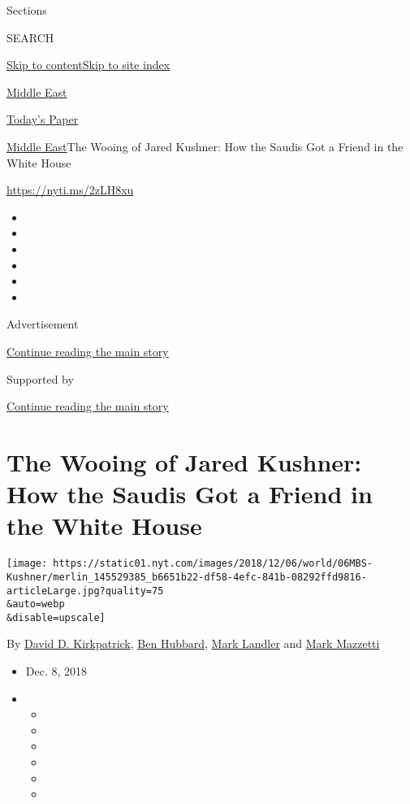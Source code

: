 Sections

SEARCH

\protect\hyperlink{site-content}{Skip to
content}\protect\hyperlink{site-index}{Skip to site index}

\href{https://www.nytimes.com/section/world/middleeast}{Middle East}

\href{https://myaccount.nytimes.com/auth/login?response_type=cookie\&client_id=vi}{}

\href{https://www.nytimes.com/section/todayspaper}{Today's Paper}

\href{/section/world/middleeast}{Middle East}\textbar{}The Wooing of
Jared Kushner: How the Saudis Got a Friend in the White House

\url{https://nyti.ms/2zLH8xu}

\begin{itemize}
\item
\item
\item
\item
\item
\item
\end{itemize}

Advertisement

\protect\hyperlink{after-top}{Continue reading the main story}

Supported by

\protect\hyperlink{after-sponsor}{Continue reading the main story}

\hypertarget{the-wooing-of-jared-kushner-how-the-saudis-got-a-friend-in-the-white-house}{%
\section{The Wooing of Jared Kushner: How the Saudis Got a Friend in the
White
House}\label{the-wooing-of-jared-kushner-how-the-saudis-got-a-friend-in-the-white-house}}

\texttt{[image: https://static01.nyt.com/images/2018/12/06/world/06MBS-Kushner/merlin\_145529385\_b6651b22-df58-4efc-841b-08292ffd9816-articleLarge.jpg?quality=75\\\&auto=webp\\\&disable=upscale]}

By \href{https://www.nytimes.com/by/david-d-kirkpatrick}{David D.
Kirkpatrick}, \href{https://www.nytimes.com/by/ben-hubbard}{Ben
Hubbard}, \href{https://www.nytimes.com/by/mark-landler}{Mark Landler}
and \href{https://www.nytimes.com/by/mark-mazzetti}{Mark Mazzetti}

\begin{itemize}
\item
  Dec. 8, 2018
\item
  \begin{itemize}
  \item
  \item
  \item
  \item
  \item
  \item
  \end{itemize}
\end{itemize}

